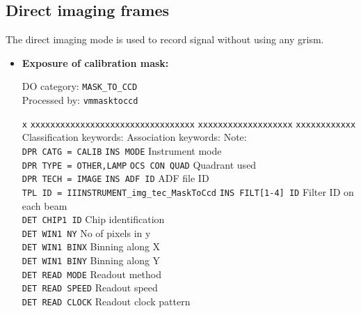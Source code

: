\subsection{Direct imaging frames}
\label{DATA:DIR}

The direct imaging mode is used to record signal without using any grism.

{\small \begin{itemize}

\item {\bf Exposure of calibration mask:}

DO category: {\tt MASK\_TO\_CCD} \\
Processed by: {\tt vmmasktoccd}

\begin{tabbing}
{\tt x} \= {\tt xxxxxxxxxxxxxxxxxxxxxxxxxxxxxxxxx} \= {\tt xxxxxxxxxxxxxxxxxxx} \= {\tt xxxxxxxxxxxx} \kill
\> Classification keywords: \> Association keywords: \> Note: \\
\> {\tt DPR CATG = CALIB} \> {\tt INS MODE} \> Instrument mode \\
\> {\tt DPR TYPE = OTHER,LAMP} \> {\tt OCS CON QUAD} \> Quadrant used \\
\> {\tt DPR TECH = IMAGE} \> {\tt INS ADF ID} \> ADF file ID \\
\> {\tt TPL ID = IIINSTRUMENT\_img\_tec\_MaskToCcd} \> {\tt INS FILT[1-4] ID} \> Filter ID on each beam \\
 \> \> {\tt DET CHIP1 ID} \> Chip identification \\
 \> \> {\tt DET WIN1 NY} \> No of pixels in y \\
 \> \> {\tt DET WIN1 BINX} \> Binning along X \\
 \> \> {\tt DET WIN1 BINY} \> Binning along Y \\
 \> \> {\tt DET READ MODE} \> Readout method \\
 \> \> {\tt DET READ SPEED} \> Readout speed \\
 \> \> {\tt DET READ CLOCK} \> Readout clock pattern \\
\end{tabbing}

\end{itemize}}



